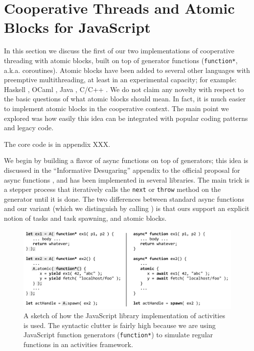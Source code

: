 \documentclass[acmsmall,anonymous,review]{acmart}\settopmatter{printfolios=true,printccs=false,printacmref=false}
\begin{document}
\section{Cooperative Threads and Atomic Blocks for JavaScript}

In this section we discuss the first of our two implementations of cooperative threading with atomic blocks, built on top of generator functions (\texttt{function*}, a.k.a. coroutines).
Atomic blocks have been added to several other languages with preemptive multithreading, at least in an experimental capacity; for example: Haskell \cite{Harris2005}, OCaml \cite{Ringenburg2005}, Java \cite{Herlihy2006}, C/C++ \cite{Ni2008}.
We do not claim any novelty with respect to the basic questions of what atomic blocks should mean.
In fact, it is much easier to implement atomic blocks in the cooperative context.
The main point we explored was how easily this idea can be integrated with popular coding patterns and legacy code.

The core code is in appendix XXX.

We begin by building a flavor of async functions on top of generators; this idea is discussed in the ``Informative Desugaring'' appendix to the official proposal for async functions \cite{Terlson2016}, and has been implemented in several libraries.
The main trick is a stepper process that iteratively calls the \texttt{next} or \texttt{throw} method on the generator until it is done.
The two differences between standard async functions and our variant (which we distinguish by calling \emph{\asyncs{}}) is that ours support an explicit notion of tasks and task spawning, and atomic blocks.

\begin{figure}
\includegraphics[scale=0.75]{Code/trivial_js}
\caption{A sketch of how the JavaScript library implementation of activities is used.
The syntactic clutter is fairly high because we are using JavaScript function generators (\texttt{function*}) to simulate regular functions in an activities framework.}
\label{fig:trivial_js}
\end{figure}
\end{document}

